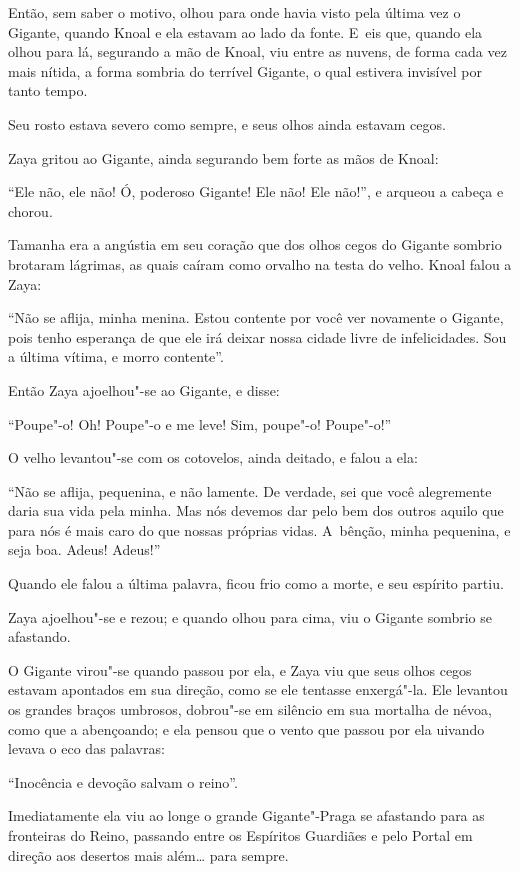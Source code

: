 Então, sem saber o motivo, olhou para onde havia visto pela última vez o
Gigante, quando Knoal e ela estavam ao lado da fonte. E~eis que, quando
ela olhou para lá, segurando a mão de Knoal, viu entre as nuvens, de
forma cada vez mais nítida, a forma sombria do terrível Gigante, o qual
estivera invisível por tanto tempo.

Seu rosto estava severo como sempre, e seus olhos ainda estavam cegos.

Zaya gritou ao Gigante, ainda segurando bem forte as mãos de Knoal:

``Ele não, ele não! Ó, poderoso Gigante! Ele não! Ele não!'', e arqueou
a cabeça e chorou.

Tamanha era a angústia em seu coração que dos olhos cegos do Gigante
sombrio brotaram lágrimas, as quais caíram como orvalho na testa do
velho. Knoal falou a Zaya:

``Não se aflija, minha menina. Estou contente por você ver novamente o
Gigante, pois tenho esperança de que ele irá deixar nossa cidade livre
de infelicidades. Sou a última vítima, e morro contente''.

Então Zaya ajoelhou"-se ao Gigante, e disse:

``Poupe"-o! Oh! Poupe"-o e me leve! Sim, poupe"-o! Poupe"-o!''

O velho levantou"-se com os cotovelos, ainda deitado, e falou a ela:

``Não se aflija, pequenina, e não lamente. De verdade, sei que você
alegremente daria sua vida pela minha. Mas nós devemos dar pelo bem dos
outros aquilo que para nós é mais caro do que nossas próprias vidas. A~bênção, minha pequenina, e seja boa. Adeus! Adeus!''

Quando ele falou a última palavra, ficou frio como a morte, e seu
espírito partiu.

Zaya ajoelhou"-se e rezou; e quando olhou para cima, viu o Gigante
sombrio se afastando.

O Gigante virou"-se quando passou por ela, e Zaya viu que seus olhos
cegos estavam apontados em sua direção, como se ele tentasse enxergá"-la.
Ele levantou os grandes braços umbrosos, dobrou"-se em silêncio em sua
mortalha de névoa, como que a abençoando; e ela pensou que o vento que
passou por ela uivando levava o eco das palavras:

``Inocência e devoção salvam o reino''.

\smallskip
Imediatamente ela viu ao longe o grande Gigante"-Praga se afastando para
as fronteiras do Reino, passando entre os Espíritos Guardiães e pelo
Portal em direção aos desertos mais além… para sempre.
